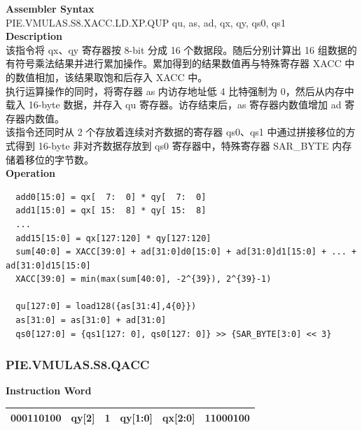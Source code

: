 \textbf{Assembler Syntax} \\
PIE.VMULAS.S8.XACC.LD.XP.QUP qu, as, ad, qx, qy, qs0, qs1 \\
\textbf{Description} \\
该指令将 qx、qy 寄存器按 8-bit 分成 16 个数据段。随后分别计算出 16 组数据的有符号乘法结果并进行累加操作。累加得到的结果数值再与特殊寄存器 XACC 中的数值相加，该结果取饱和后存入 XACC 中。\\
执行运算操作的同时，将寄存器 as 内访存地址低 4 比特强制为 0，然后从内存中载入 16-byte 数据，并存入 qu 寄存器。访存结束后，as 寄存器内数值增加 ad 寄存器内数值。\\
该指令还同时从 2 个存放着连续对齐数据的寄存器 qs0、qs1 中通过拼接移位的方式得到 16-byte 非对齐数据存放到 qs0 寄存器中，特殊寄存器 SAR\_BYTE 内存储着移位的字节数。\\
\textbf{Operation}
\begin{lstlisting}
  add0[15:0] = qx[  7:  0] * qy[  7:  0]
  add1[15:0] = qx[ 15:  8] * qy[ 15:  8]
  ...
  add15[15:0] = qx[127:120] * qy[127:120]
  sum[40:0] = XACC[39:0] + ad[31:0]d0[15:0] + ad[31:0]d1[15:0] + ... + ad[31:0]d15[15:0]
  XACC[39:0] = min(max(sum[40:0], -2^{39}), 2^{39}-1)

  qu[127:0] = load128({as[31:4],4{0}})
  as[31:0] = as[31:0] + ad[31:0]
  qs0[127:0] = {qs1[127: 0], qs0[127: 0]} >> {SAR_BYTE[3:0] << 3}
\end{lstlisting}

\newpage
\subsubsection{PIE.VMULAS.S8.QACC}\label{instruction:PIEVMULASS8QACC}
\setlength\tabcolsep{6pt}
\textbf{Instruction Word} \\
\begin{tabular}{|c|c|c|c|c|c|}
	\hline
	000110100 & qy[2] & 1 & qy[1:0] & qx[2:0] & 11000100 \\
	\hline
\end{tabular}

